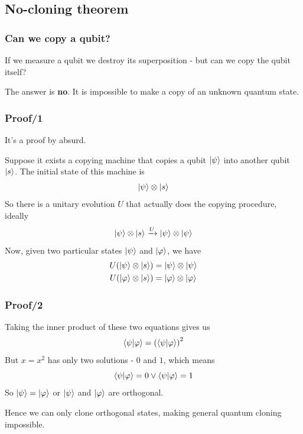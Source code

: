 \documentclass{beamer}
\begin{document}
  \subsection{No-cloning theorem}
  \begin{frame}
    \frametitle{Can we copy a qubit?}
    If we measure a qubit we destroy its superposition - but can we copy the qubit itself?
    
    The answer is \textbf{no}. It is impossible to make a copy of an unknown quantum state.
  \end{frame}
  \begin{frame}
    \frametitle{Proof/1}
    It's a proof by absurd.

    Suppose it exists a copying machine that copies a qubit $\ket{\psi}$ into another qubit $\ket{s}$.
    The initial state of this machine is
    \begin{equation*}
      \ket{\psi} \otimes \ket{s}
    \end{equation*}
    So there is a unitary evolution $U$ that actually does the copying procedure, ideally
    \begin{equation*}
      \ket{\psi} \otimes \ket{s} \xrightarrow{U} \ket{\psi} \otimes \ket{\psi}
    \end{equation*}
    Now, given two particular states $\ket{\psi}$ and $\ket{\varphi}$, we have
    \begin{align*}
      U(\ket{\psi}\otimes\ket{s}) &= \ket{\psi}\otimes\ket{\psi} \\
      U(\ket{\varphi}\otimes\ket{s}) &= \ket{\varphi}\otimes\ket{\varphi}
    \end{align*}
  \end{frame}
  \begin{frame}
    \frametitle{Proof/2}
    Taking the inner product of these two equations gives us
    \begin{equation*}
      \braket{\psi|\varphi} = \left(\braket{\psi|\varphi}\right)^2
    \end{equation*}
    But $x = x^2$ has only two solutions - $0$ and $1$, which means
    \begin{equation*}
      \braket{\psi|\varphi} = 0 \vee \braket{\psi|\varphi} = 1
    \end{equation*}
    So $\ket{\psi} = \ket{\varphi}$ or $\ket{\psi}$ and $\ket{\varphi}$ are orthogonal.

    Hence we can only clone orthogonal states, making general quantum cloning impossible.
  \end{frame}
\end{document}
